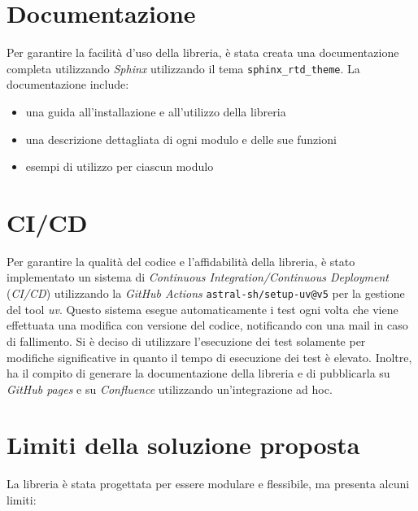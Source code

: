 \section{Documentazione}
Per garantire la facilità d'uso della libreria, è stata creata una documentazione completa utilizzando \textit{Sphinx} utilizzando il tema \texttt{sphinx\_rtd\_theme}. La documentazione include:

\begin{itemize}
    \item una guida all'installazione e all'utilizzo della libreria
    \item una descrizione dettagliata di ogni modulo e delle sue funzioni
    \item esempi di utilizzo per ciascun modulo
\end{itemize}

\section{CI/CD}

Per garantire la qualità del codice e l'affidabilità della libreria, è stato implementato un sistema di \textit{Continuous Integration/Continuous Deployment} (\textit{CI/CD}) utilizzando la \textit{GitHub Actions} \texttt{astral-sh/setup-uv@v5} per la gestione del tool \textit{uv}. Questo sistema esegue automaticamente i test ogni volta che viene effettuata una modifica con versione del codice, notificando con una mail in caso di fallimento. Si è deciso di utilizzare l'esecuzione dei test solamente per modifiche significative in quanto il tempo di esecuzione dei test è elevato. Inoltre, ha il compito di generare la documentazione della libreria e di pubblicarla su \textit{GitHub pages} e su \textit{Confluence} utilizzando un'integrazione ad hoc.

\section{Limiti della soluzione proposta}

La libreria è stata progettata per essere modulare e flessibile, ma presenta alcuni limiti:

